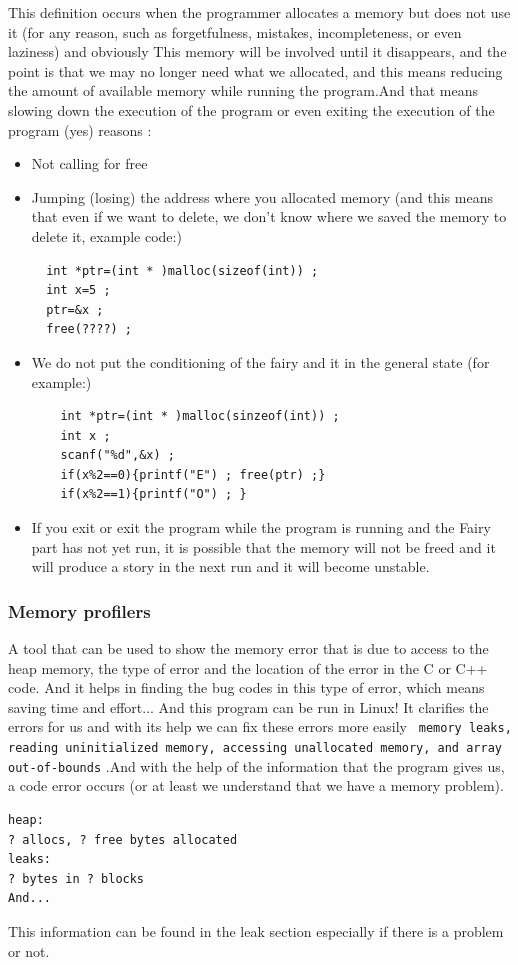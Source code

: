 \documentclass[12pt]{article}
\begin{document}
This definition occurs when the programmer allocates a memory but does not use it (for any reason, such as forgetfulness, mistakes, incompleteness, or even laziness) and obviously This memory will be involved until it disappears, and the point is that we may no longer need what we allocated, and this means reducing the amount of available memory while running the program.And that means slowing down the execution of the program or even exiting the execution of the program (yes)
\newpage
 reasons :
\begin{itemize}
  \item Not calling for free
  \item Jumping (losing) the address where you allocated memory (and this means that even if we want to delete, we don't know where we saved the memory to delete it, example code:)\newline
  \begin{lstlisting}
  int *ptr=(int * )malloc(sizeof(int)) ;
  int x=5 ;
  ptr=&x ;
  free(????) ;
  \end{lstlisting}
  \item We do not put the conditioning of the fairy and it in the general state (for example:)\newline
  \begin{lstlisting}
    int *ptr=(int * )malloc(sinzeof(int)) ;
    int x ;
    scanf("%d",&x) ;
    if(x%2==0){printf("E") ; free(ptr) ;}
    if(x%2==1){printf("O") ; }
  \end{lstlisting}
  \item If you exit or exit the program while the program is running and the Fairy part has not yet run, it is possible that the memory will not be freed and it will produce a story in the next run and it will become unstable.


\end{itemize}

\subsubsection{Memory profilers}
A tool that can be used to show the memory error that is due to access to the heap memory, the type of error and the location of the error in the C or C++ code.
And it helps in finding the bug codes in this type of error, which means saving time and effort...\newline
And this program can be run in Linux!\newline
It clarifies the errors for us and with its help we can fix these errors more easily
\texttt{ memory leaks, reading uninitialized memory, accessing unallocated memory, and array out-of-bounds}
.And with the help of the information that the program gives us, a code error occurs (or at least we understand that we have a memory problem).
\begin{lstlisting}
heap:
? allocs, ? free bytes allocated
leaks:
? bytes in ? blocks
And...
\end{lstlisting}
This information can be found in the leak section especially if there is a problem or not.
\end{document}
